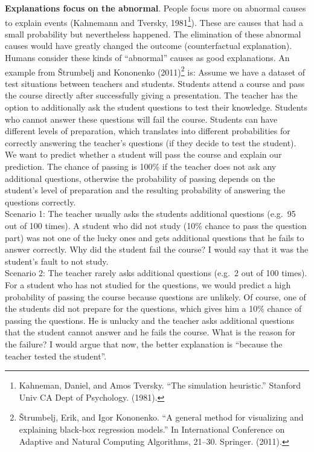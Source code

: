 \documentclass[
  11pt,
]{scrbook}
\begin{document}
\textbf{Explanations focus on the abnormal}.
People focus more on abnormal causes to explain events (Kahnemann and Tversky, 1981\footnote{Kahneman, Daniel, and Amos Tversky. ``The simulation heuristic.'' Stanford Univ CA Dept of Psychology. (1981).}).
These are causes that had a small probability but nevertheless happened.
The elimination of these abnormal causes would have greatly changed the outcome (counterfactual explanation).
Humans consider these kinds of ``abnormal'' causes as good explanations.
An example from Štrumbelj and Kononenko (2011)\footnote{Štrumbelj, Erik, and Igor Kononenko. ``A general method for visualizing and explaining black-box regression models.'' In International Conference on Adaptive and Natural Computing Algorithms, 21--30. Springer. (2011).} is:
Assume we have a dataset of test situations between teachers and students.
Students attend a course and pass the course directly after successfully giving a presentation.
The teacher has the option to additionally ask the student questions to test their knowledge.
Students who cannot answer these questions will fail the course.
Students can have different levels of preparation, which translates into different probabilities for correctly answering the teacher's questions (if they decide to test the student).
We want to predict whether a student will pass the course and explain our prediction.
The chance of passing is 100\% if the teacher does not ask any additional questions, otherwise the probability of passing depends on the student's level of preparation and the resulting probability of answering the questions correctly.\\
Scenario 1:
The teacher usually asks the students additional questions (e.g.~95 out of 100 times).
A student who did not study (10\% chance to pass the question part) was not one of the lucky ones and gets additional questions that he fails to answer correctly.
Why did the student fail the course?
I would say that it was the student's fault to not study.\\
Scenario 2:
The teacher rarely asks additional questions (e.g.~2 out of 100 times).
For a student who has not studied for the questions, we would predict a high probability of passing the course because questions are unlikely.
Of course, one of the students did not prepare for the questions, which gives him a 10\% chance of passing the questions.
He is unlucky and the teacher asks additional questions that the student cannot answer and he fails the course.
What is the reason for the failure?
I would argue that now, the better explanation is ``because the teacher tested the student''.
\end{document}
